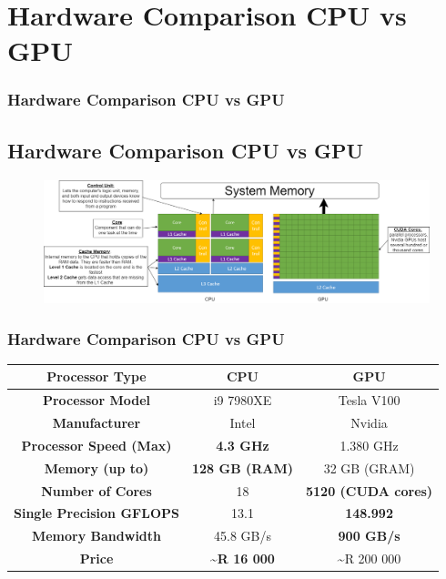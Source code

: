 \documentclass[11pt]{beamer}
\begin{document}
\section{Hardware Comparison CPU vs GPU}
\begin{frame}
	\frametitle{Hardware Comparison CPU vs GPU}
	\subsection{Hardware Comparison CPU vs GPU}
	\begin{figure}
		\includegraphics[width=\textwidth,height=\textheight,keepaspectratio]{cpu_vs_gpu}
	\end{figure}
\end{frame}

\begin{frame}
	\frametitle{Hardware Comparison CPU vs GPU}
	\begin{center}
		\begin{tabular}{| c | c | c |}
			\hline
			\textbf{Processor Type} & \textbf{CPU} & \textbf{GPU} \\ 
			\hline
			\textbf{Processor Model} & 	i9 7980XE & Tesla V100 \\  
			\textbf{Manufacturer} & Intel & Nvidia  \\
			\textbf{Processor Speed (Max)} &  \textbf{4.3 GHz}& 1.380 GHz  \\
			\textbf{Memory (up to)} & \textbf{128 GB (RAM)} & 32 GB (GRAM) \\
			\textbf{Number of Cores} & 18 & \textbf{5120 (CUDA cores)} \\
			\textbf{Single Precision  GFLOPS} & 13.1 & \textbf{148.992} \\
			\textbf{Memory Bandwidth} & 45.8 GB/s & \textbf{900 GB/s}\\
			\textbf{Price} & \textasciitilde \textbf{R 16 000} & \textasciitilde R 200 000\\
			\hline  
		\end{tabular}
	\end{center}
\end{frame}
\end{document}
